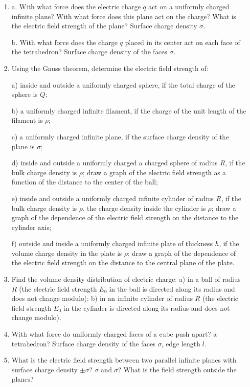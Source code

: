\documentclass{article}
\begin{document}
\begin{enumerate}[label=6.2.\arabic*]
\item a. With what force does the electric charge $q$ act on a uniformly charged infinite plane? With what force does this plane act on the charge? What is the electric field strength of the plane? Surface charge density $\sigma$. 

b. With what force does the charge $q$ placed in its center act on each face of the tetrahedron? Surface charge density of the faces $\sigma$.

\item Using the Gauss theorem, determine the electric field strength of: 

a) inside and outside a uniformly charged sphere, if the total charge of the sphere is $Q$; 

b) a uniformly charged infinite filament, if the charge of the unit length of the filament is $\rho$; 

c) a uniformly charged infinite plane, if the surface charge density of the plane is $\sigma$; 

d) inside and outside a uniformly charged a charged sphere of radius $R$, if the bulk charge density is $\rho$; draw a graph of the electric field strength as a function of the distance to the center of the ball; 

e) inside and outside a uniformly charged infinite cylinder of radius $R$, if the bulk charge density is $\rho$. the charge density inside the cylinder is $\rho$; draw a graph of the dependence of the electric field strength on the distance to the cylinder axis; 

f) outside and inside a uniformly charged infinite plate of thickness $h$, if the volume charge density in the plate is $\rho$; draw a graph of the dependence of the electric field strength on the distance to the central plane of the plate.

\item Find the volume density distribution of electric charge: a) in a ball of radius $R$ (the electric field strength $E_0$ in the ball is directed along its radius and does not change modulo); b) in an infinite cylinder of radius $R$ (the electric field strength $E_0$ in the cylinder is directed along its radius and does not change modulo).

\item With what force do uniformly charged faces of a cube push apart? a tetrahedron? Surface charge density of the faces $\sigma$, edge length $l$.

\item What is the electric field strength between two parallel infinite planes with surface charge density $\pm \sigma$? $\sigma$ and $\sigma$? What is the field strength outside the planes?


\end{enumerate}
\end{document}
